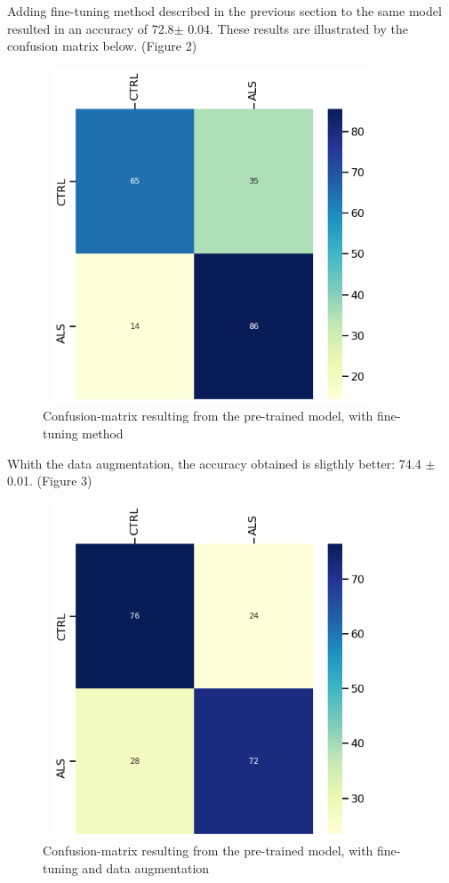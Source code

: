 \newpage
Adding fine-tuning method described in the previous section to the same model resulted in an accuracy of 72.8$\pm$ 0.04. These results are illustrated by the confusion matrix below. (Figure 2)
\begin{figure}[H]
\centering
\caption{Confusion-matrix resulting from the pre-trained model, with fine-tuning method}
\includegraphics[width=10cm, height=10cm]{finetuning_model_results}
\end{figure}

\newpage
Whith the data augmentation, the accuracy obtained is sligthly better: 74.4 $\pm$ 0.01. (Figure 3)
\begin{figure}[H]
\centering
\caption{Confusion-matrix resulting from the pre-trained model, with fine-tuning and data augmentation}
\includegraphics[width=10cm, height=10cm]{finetuning_data_augmentation_model_results}
\end{figure}

